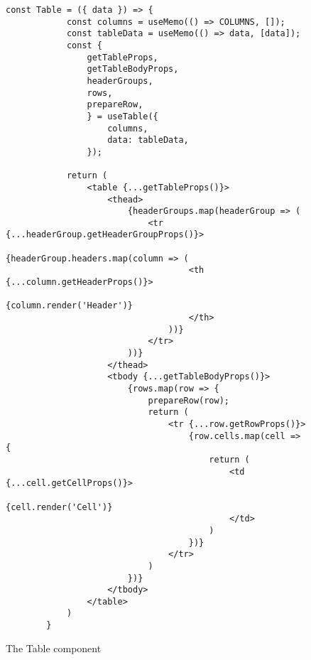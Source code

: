 \begin{figure}[htbp]
    \begin{lstlisting}[language=React]
        const Table = ({ data }) => {
            const columns = useMemo(() => COLUMNS, []);
            const tableData = useMemo(() => data, [data]);
            const {
                getTableProps,
                getTableBodyProps,
                headerGroups,
                rows,
                prepareRow,
                } = useTable({
                    columns,
                    data: tableData,
                });
            
            return (
                <table {...getTableProps()}>
                    <thead>
                        {headerGroups.map(headerGroup => (
                            <tr {...headerGroup.getHeaderGroupProps()}>
                                {headerGroup.headers.map(column => (
                                    <th {...column.getHeaderProps()}>
                                        {column.render('Header')}
                                    </th>
                                ))}
                            </tr>
                        ))}
                    </thead>
                    <tbody {...getTableBodyProps()}>
                        {rows.map(row => {
                            prepareRow(row);
                            return (
                                <tr {...row.getRowProps()}>
                                    {row.cells.map(cell => {
                                        return (
                                            <td {...cell.getCellProps()}>
                                                {cell.render('Cell')}
                                            </td>
                                        )
                                    })}
                                </tr>
                            )
                        })}
                    </tbody>
                </table>
            )
        }
    \end{lstlisting}
    \caption{The Table component}
    \label{fig:tableComponent}
\end{figure}